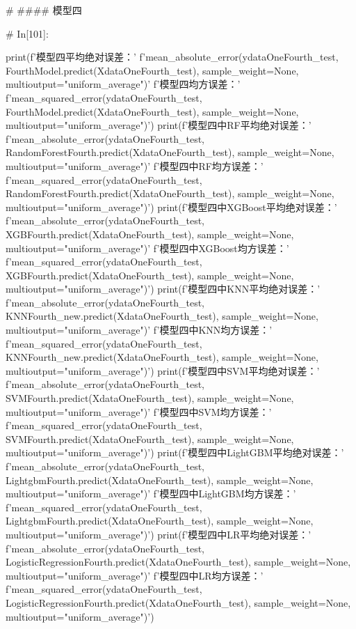 \documentclass{MathorCupmodeling}
\begin{document}
\begin{python}
# #### 模型四

# In[101]:


print(f'模型四平均绝对误差：'
      f'{mean_absolute_error(ydataOneFourth_test, FourthModel.predict(XdataOneFourth_test), sample_weight=None, multioutput="uniform_average")}\n'
      f'模型四均方误差：'
      f'{mean_squared_error(ydataOneFourth_test, FourthModel.predict(XdataOneFourth_test), sample_weight=None, multioutput="uniform_average")}')
print(f'模型四中RF平均绝对误差：'
      f'{mean_absolute_error(ydataOneFourth_test, RandomForestFourth.predict(XdataOneFourth_test), sample_weight=None, multioutput="uniform_average")}\n'
      f'模型四中RF均方误差：'
      f'{mean_squared_error(ydataOneFourth_test, RandomForestFourth.predict(XdataOneFourth_test), sample_weight=None, multioutput="uniform_average")}')
print(f'模型四中XGBoost平均绝对误差：'
      f'{mean_absolute_error(ydataOneFourth_test, XGBFourth.predict(XdataOneFourth_test), sample_weight=None, multioutput="uniform_average")}\n'
      f'模型四中XGBoost均方误差：'
      f'{mean_squared_error(ydataOneFourth_test, XGBFourth.predict(XdataOneFourth_test), sample_weight=None, multioutput="uniform_average")}')
print(f'模型四中KNN平均绝对误差：'
      f'{mean_absolute_error(ydataOneFourth_test, KNNFourth_new.predict(XdataOneFourth_test), sample_weight=None, multioutput="uniform_average")}\n'
      f'模型四中KNN均方误差：'
      f'{mean_squared_error(ydataOneFourth_test, KNNFourth_new.predict(XdataOneFourth_test), sample_weight=None, multioutput="uniform_average")}')
print(f'模型四中SVM平均绝对误差：'
      f'{mean_absolute_error(ydataOneFourth_test, SVMFourth.predict(XdataOneFourth_test), sample_weight=None, multioutput="uniform_average")}\n'
      f'模型四中SVM均方误差：'
      f'{mean_squared_error(ydataOneFourth_test, SVMFourth.predict(XdataOneFourth_test), sample_weight=None, multioutput="uniform_average")}')
print(f'模型四中LightGBM平均绝对误差：'
      f'{mean_absolute_error(ydataOneFourth_test, LightgbmFourth.predict(XdataOneFourth_test), sample_weight=None, multioutput="uniform_average")}\n'
      f'模型四中LightGBM均方误差：'
      f'{mean_squared_error(ydataOneFourth_test, LightgbmFourth.predict(XdataOneFourth_test), sample_weight=None, multioutput="uniform_average")}')
print(f'模型四中LR平均绝对误差：'
      f'{mean_absolute_error(ydataOneFourth_test, LogisticRegressionFourth.predict(XdataOneFourth_test), sample_weight=None, multioutput="uniform_average")}\n'
      f'模型四中LR均方误差：'
      f'{mean_squared_error(ydataOneFourth_test, LogisticRegressionFourth.predict(XdataOneFourth_test), sample_weight=None, multioutput="uniform_average")}')



\end{python}
\end{document}

